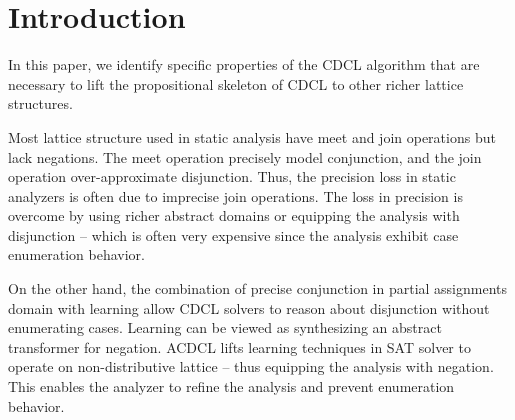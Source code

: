 \section{Introduction}
%
In this paper, we identify specific properties of the CDCL algorithm that 
are necessary to lift the propositional skeleton of CDCL to other richer 
lattice structures.

Most lattice structure used in static analysis have meet and join operations 
but lack negations. The meet operation precisely model conjunction, and
the join operation over-approximate disjunction. Thus, the precision loss in 
static analyzers is often due to imprecise join operations. The loss in precision is
overcome by using richer abstract domains or equipping the analysis with disjunction --
which is often very expensive since the analysis exhibit case enumeration behavior. 
 
On the other hand, the combination of precise conjunction in partial assignments domain 
with learning allow CDCL solvers to reason about disjunction without 
enumerating cases. Learning can be viewed as synthesizing an abstract transformer for 
negation. ACDCL lifts learning techniques in SAT solver to operate on non-distributive 
lattice -- thus equipping the analysis with negation. This enables the analyzer to refine 
the analysis and prevent enumeration behavior.
